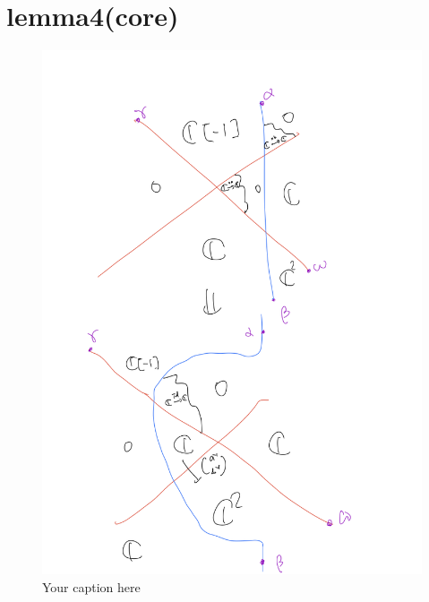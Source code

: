 \section{lemma4(core)}

\begin{lemma}
\end{lemma}

\begin{figure}[H] %
    \centering
    \includegraphics[width=\linewidth]{diagrams/lemma4/1.png} %
    \caption{Your caption here}
    \label{fig:your-label}
\end{figure}